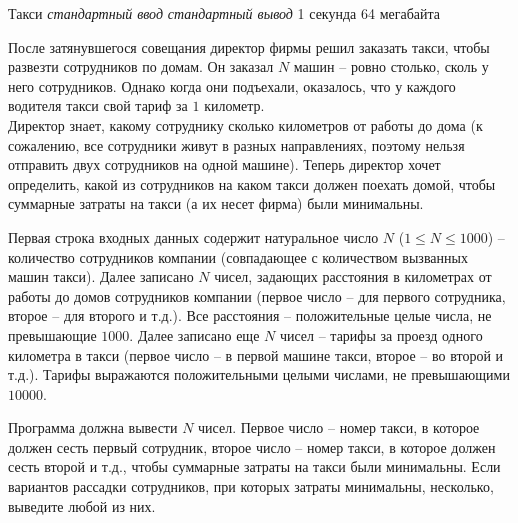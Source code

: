 \begin{problem}%
{Такси}%
{\textsl{стандартный ввод}}%
{\textsl{стандартный вывод}}%
{1 секунда}%
{64 мегабайта}%
{}

После затянувшегося совещания директор фирмы решил заказать такси, чтобы развезти сотрудников по домам. Он заказал $N$ машин  – ровно столько, сколь у него сотрудников. Однако когда они подъехали, оказалось, что у каждого водителя такси свой тариф за $1$ километр.\\

Директор знает, какому сотруднику сколько километров от работы до дома (к сожалению, все сотрудники живут в разных направлениях, поэтому нельзя отправить двух сотрудников на одной машине). Теперь директор хочет определить, какой из сотрудников на каком такси должен поехать домой, чтобы суммарные затраты на такси (а их несет фирма) были минимальны.

\InputFile

Первая строка входных данных содержит натуральное число $N$ ($1 \le N \le 1000$)  – количество сотрудников компании (совпадающее с количеством вызванных машин такси). Далее записано $N$ чисел, задающих расстояния в километрах от работы до домов сотрудников компании (первое число  – для первого сотрудника, второе  – для второго и т.д.). Все расстояния  – положительные целые числа, не превышающие $1000$. Далее записано еще $N$ чисел  – тарифы за проезд одного километра в такси (первое число  – в первой машине такси, второе  – во второй и т.д.). Тарифы выражаются положительными целыми числами, не превышающими $10000$. 

\OutputFile

Программа должна вывести $N$ чисел. Первое число – номер такси, в которое должен сесть первый сотрудник, второе число – номер такси, в которое должен сесть второй и т.д., чтобы суммарные затраты на такси были минимальны. Если вариантов рассадки сотрудников, при которых затраты минимальны, несколько, выведите любой из них.

\Examples

\begin{example}
%
%
\end{example}

\end{problem}
